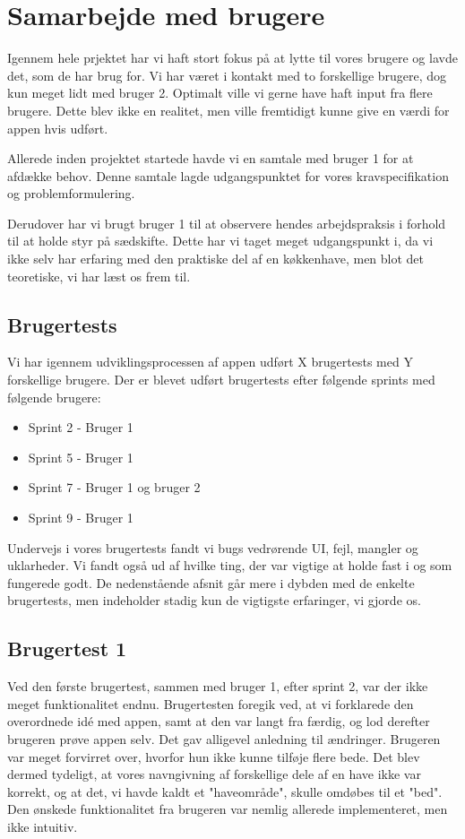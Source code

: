 \section{Samarbejde med brugere}
Igennem hele prjektet har vi haft stort fokus på at lytte til vores brugere og lavde det, som de har brug for. Vi har været i kontakt med to forskellige brugere, dog kun meget lidt med bruger 2. Optimalt ville vi gerne have haft input fra flere brugere. Dette blev ikke en realitet, men ville fremtidigt kunne give en værdi for appen hvis udført.

Allerede inden projektet startede havde vi en samtale med bruger 1 for at afdække behov. Denne samtale lagde udgangspunktet for vores kravspecifikation og problemformulering.

Derudover har vi brugt bruger 1 til at observere hendes arbejdspraksis i forhold til at holde styr på sædskifte. Dette har vi taget meget udgangspunkt i, da vi ikke selv har erfaring med den praktiske del af en køkkenhave, men blot det teoretiske, vi har læst os frem til.

\subsection{Brugertests}
Vi har igennem udviklingsprocessen af appen udført X brugertests med Y forskellige brugere. Der er blevet udført brugertests efter følgende sprints med følgende brugere:
\begin{itemize}
    \item Sprint 2 - Bruger 1
    \item Sprint 5 - Bruger 1
    \item Sprint 7 - Bruger 1 og bruger 2
    \item Sprint 9 - Bruger 1
\end{itemize}

Undervejs i vores brugertests fandt vi bugs vedrørende UI, fejl, mangler og uklarheder. Vi fandt også ud af hvilke ting, der var vigtige at holde fast i og som fungerede godt. De nedenstående afsnit går mere i dybden med de enkelte brugertests, men indeholder stadig kun de vigtigste erfaringer, vi gjorde os.

\subsection{Brugertest 1}
Ved den første brugertest, sammen med bruger 1, efter sprint 2, var der ikke meget funktionalitet endnu. Brugertesten foregik ved, at vi forklarede den overordnede idé med appen, samt at den var langt fra færdig, og lod derefter brugeren prøve appen selv. Det gav alligevel anledning til ændringer. Brugeren var meget forvirret over, hvorfor hun ikke kunne tilføje flere bede. Det blev dermed tydeligt, at vores navngivning af forskellige dele af en have ikke var korrekt, og at det, vi havde kaldt et "haveområde", skulle omdøbes til et "bed". Den ønskede funktionalitet fra brugeren var nemlig allerede implementeret, men ikke intuitiv.

